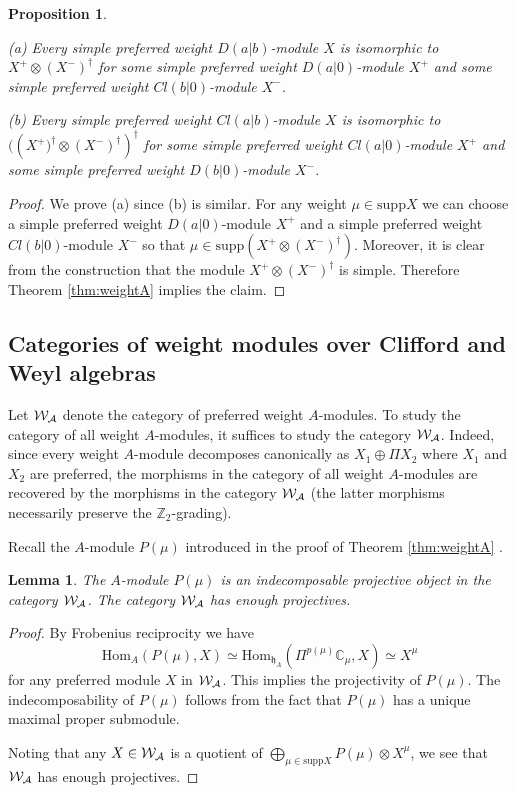 \documentclass[12pt]{amsart}
\makeatletter
\def\mathcal{\cal}
\def\@putname#1#2#3#4{\def\@@ref{#3}\let\old@bf\bf
        \def\bf##1{\old@bf\if?\noexpand##1?{#4}\else##1\fi}%
	#1{#2}%
        \let\bf\old@bf}
\def\@putname#1#2#3#4{\def\@@ref{#3}\let\old@bf\bf	%
	\let\old@reset@font\reset@font			%
        \def\bf##1{\old@bf\if?\noexpand##1?{#4}\else##1\fi}%
	\def\reset@font##1##2{\old@reset@font##1\if?\noexpand##2?{#4}\else##2\fi}#1{#2}%
        \let\bf\old@bf\let\reset@font\old@reset@font}
\let\my@ref=\ref
\def\ref#1{\@putname\my@ref{#1}{#1}{\tiny\rm\@@ref}}
\theoremstyle{plain} %
\numberwithin{equation}{section}
\theoremstyle{definition}
\theoremstyle{remark}
\theoremstyle{plain} %
\newtheorem{lemma}[definition]{Lemma}
\newtheorem{proposition}[definition]{Proposition}
\newcommand{\cW}{\mathcal{W}}
\newcommand{\CC}{\mathbb{C}}
\newcommand{\Hom}{\mathrm{Hom}}
\newcommand{\supp}{\mathrm{supp}}
\newcommand{\gh}{\mathfrak{h}}
\def\gh{\mathfrak{h}}
\makeatother
\begin{document}
          \begin{proposition}\label{description-of-simple}

   (a)         Every simple preferred weight $D(a|b)$-module $X$ is isomorphic to $X^+\otimes (X^-)^\dagger$  for some simple preferred weight $D(a|0)$-module $X^+$ and some simple preferred weight $Cl(b|0)$-module $X^-$.
 

   (b) Every simple preferred weight $Cl(a|b)$-module $X$  is isomorphic to $(\left(X^+)^\dagger\otimes (X^-)^\dagger \right)^{\dagger}$  for some simple preferred weight $Cl(a|0)$-module $X^+$ and some
   simple preferred weight $D(b|0)$-module $X^-$.
   
 \end{proposition}
 \begin{proof} We prove (a) since (b) is similar. For any weight  $\mu\in\supp X$ we can choose  a simple preferred weight $D(a|0)$-module $X^+$  and a simple preferred weight $Cl(b|0)$-module $X^-$ so that $\mu\in \supp \left( X^+\otimes (X^-)^\dagger \right)$.  Moreover, it is clear from the construction that the module $X^+\otimes (X^-)^\dagger$ is simple.
 Therefore  Theorem \ref{thm:weightA} implies the claim. {\color{red}} 
    \end{proof}
     

    
    \subsection{Categories of weight modules over Clifford and  Weyl   algebras}

      
    Let $\cW_{A}$ denote the category of preferred weight $A$-modules. To study the category  of all weight $A$-modules, it suffices to study
    the category  $\cW_{A}$. Indeed,  since every weight $A$-module decomposes canonically as $X_1 \oplus \Pi X_2$ where $X_1$ and $X_2$ are preferred,  the morphisms in the category of all weight $A$-modules are recovered by the morphisms in the category $\cW_{A}$ (the latter morphisms necessarily preserve the $\mathbb Z_2$-grading).

  Recall the $A$-module $P(\mu)$ introduced in  the proof of Theorem \ref{thm:weightA}.

  \begin{lemma}\label{pims} The $A$-module $P(\mu)$ is an indecomposable projective object in the category $\mathcal W_A$.
   The category  $\mathcal W_A$ has enough projectives.    
  \end{lemma}
  \begin{proof} By Frobenius reciprocity we have
    $$\Hom_A(P(\mu),X)\simeq\Hom_{\gh_A}(\Pi^{p(\mu)}\CC_\mu,X)\simeq X^\mu$$
for any preferred module $X$ in $\mathcal W_A$.     This implies the projectivity of $P(\mu)$. The indecomposability of  $P(\mu)$ follows from the fact that $P(\mu)$ has a unique maximal proper submodule.

    
   
    Noting that any $X\in \cW_{A}$ is a quotient of $\bigoplus_{\mu\in\supp X}P(\mu)\otimes X^\mu$, we see that  $\mathcal W_A$ has enough projectives.

  
    \end{proof}
      
\end{document}
